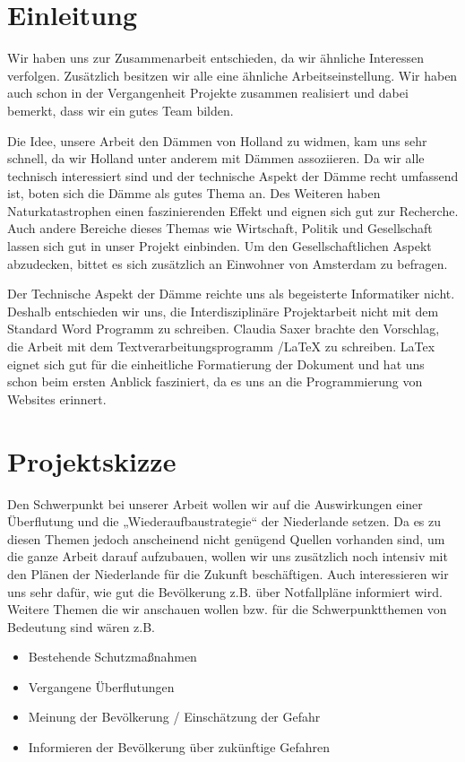 \part{Einleitung}

Wir haben uns zur Zusammenarbeit entschieden, da wir ähnliche Interessen verfolgen.
Zusätzlich besitzen wir alle eine ähnliche Arbeitseinstellung. 
Wir haben auch schon in der Vergangenheit Projekte zusammen realisiert und dabei bemerkt, dass wir ein gutes Team bilden.
 
Die Idee, unsere Arbeit den Dämmen von Holland zu widmen, kam uns sehr schnell, da wir Holland unter anderem mit Dämmen assoziieren.
Da wir alle technisch interessiert sind und der technische Aspekt der Dämme recht umfassend ist, boten sich die Dämme als gutes Thema an. 
Des Weiteren haben Naturkatastrophen einen faszinierenden Effekt und eignen sich gut zur Recherche.
Auch andere Bereiche dieses Themas wie Wirtschaft, Politik und Gesellschaft lassen sich gut in unser Projekt einbinden. 
Um den Gesellschaftlichen Aspekt abzudecken, bittet es sich zusätzlich an Einwohner von Amsterdam zu befragen.

Der Technische Aspekt der Dämme reichte uns als begeisterte Informatiker nicht. Deshalb entschieden wir uns, die Interdisziplinäre 
Projektarbeit nicht mit dem Standard Word Programm zu schreiben. Claudia Saxer brachte den Vorschlag, die Arbeit mit dem Textverarbeitungsprogramm
{/LaTeX} zu schreiben. 
LaTex eignet sich gut für die einheitliche Formatierung der Dokument und hat uns schon beim ersten Anblick fasziniert, da es uns an die 
Programmierung  von Websites erinnert.


\part{Projektskizze}
 
Den Schwerpunkt bei unserer Arbeit wollen wir auf die Auswirkungen 
einer Überflutung und die „Wiederaufbaustrategie“ der Niederlande setzen. 
Da es zu diesen Themen jedoch anscheinend nicht genügend Quellen vorhanden sind, 
um die ganze Arbeit darauf aufzubauen, wollen wir uns zusätzlich noch intensiv mit 
den Plänen der Niederlande für die Zukunft beschäftigen. Auch interessieren wir uns 
sehr dafür, wie gut die Bevölkerung z.B. über Notfallpläne informiert wird. 
Weitere Themen die wir anschauen wollen bzw. für die Schwerpunktthemen von 
Bedeutung sind wären z.B.
 
\begin{itemize}  
\item Bestehende Schutzmaßnahmen
\item Vergangene Überflutungen
\item Meinung der Bevölkerung / Einschätzung der Gefahr
\item Informieren der Bevölkerung über zukünftige Gefahren
\end{itemize}    
